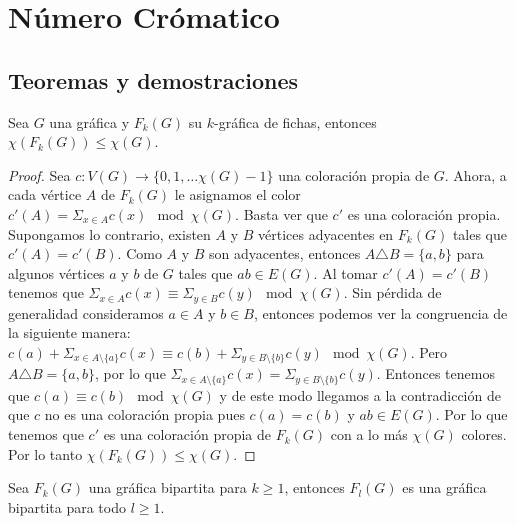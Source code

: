 \chapter{N\'umero Cr\'omatico}%
\label{cap:num cromatico}

\section{Teoremas y demostraciones}%


\begin{teorema}
\label{teo:num cromatico de G y F(G)}
    Sea $G$ una gr\'afica y $F_k(G)$ su $k$-gr\'afica de fichas, entonces
    $\chi(F_k(G)) \leq \chi (G)$.
\end{teorema}

\begin{proof}
    Sea $c: V(G) \to \{0,1, \dots \chi(G)-1\}$ una coloraci\'on propia de $G$.
    Ahora, a cada v\'ertice $A$ de $F_k(G)$ le asignamos el color $ c'(A)=
    \Sigma_{x \in A}c(x) \mod \chi(G)$. Basta ver que $c'$ es una coloraci\'on
    propia. Supongamos lo contrario, existen $A$ y $B$ v\'ertices adyacentes en
    $F_k(G)$ tales que $c'(A) = c'(B)$. Como $A$ y $B$ son adyacentes, entonces
    $A \triangle B = \{a,b\}$ para algunos v\'ertices $a$ y $b$ de $G$ tales que
    $ab \in E(G)$. Al tomar $c'(A) = c'(B)$ tenemos que $\Sigma_{x \in A}c(x)
    \equiv \Sigma_{y \in B}c(y) \mod \chi(G)$. Sin p\'erdida de generalidad
    consideramos $a \in A$ y $b \in B$, entonces podemos ver la congruencia de
    la siguiente manera: $c(a) + \Sigma_{x \in A\setminus\{a\}}c(x) \equiv c(b) +
    \Sigma_{y \in B\setminus\{b\}}c(y) \mod \chi(G)$. Pero $A \triangle B =
    \{a,b\}$, por lo que $\Sigma_{x \in A\setminus\{a\}}c(x)=\Sigma_{y \in
    B\setminus\{b\}}c(y)$. Entonces tenemos que $c(a) \equiv c(b) \mod
    \chi(G)$ y de este modo llegamos a la contradicci\'on de que $c$ no es una
    coloraci\'on propia pues $c(a) = c(b)$ y $ab \in E(G)$. Por lo que tenemos
    que $c'$ es una coloraci\'on propia de $F_k(G)$ con a lo m\'as $\chi (G)$
    colores. Por lo tanto $\chi(F_k(G)) \leq \chi (G)$.
\end{proof}

\begin{proposicion}
\label{prop:biparticion F(G)}
    Sea $F_k(G)$ una gr\'afica bipartita para $k \geq 1$, entonces $F_l(G)$
    es una gr\'afica bipartita para todo $l \geq 1$.
\end{proposicion}

